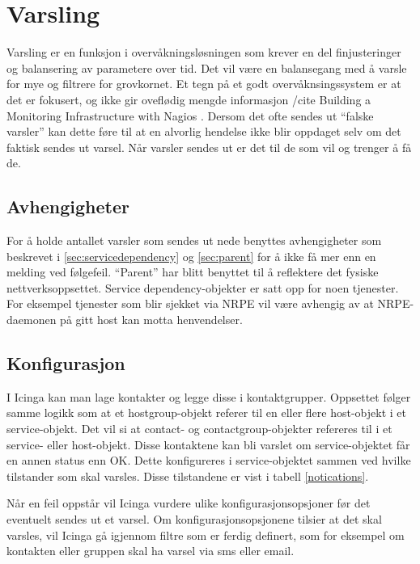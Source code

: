 \section{Varsling}
Varsling er en funksjon i overvåkningsløsningen som krever en del finjusteringer og balansering av parametere over tid. Det vil være en balansegang med å varsle for mye og filtrere for grovkornet. Et tegn på et godt overvåknsingssystem er at det er fokusert, og ikke gir oveflødig mengde informasjon /cite  Building a Monitoring Infrastructure with Nagios . Dersom det ofte sendes ut “falske varsler” kan dette føre til at en alvorlig hendelse ikke blir oppdaget selv om det faktisk sendes ut varsel. Når varsler sendes ut er det til de som vil og trenger å få de.

\subsection{Avhengigheter}
For å holde antallet varsler som sendes ut nede benyttes avhengigheter som beskrevet i \ref{sec:servicedependency}  og \ref{sec:parent} for å ikke få mer enn en melding ved følgefeil. “Parent” har blitt benyttet til å reflektere det fysiske nettverksoppsettet. Service dependency-objekter er satt opp for noen tjenester. For eksempel tjenester som blir sjekket via NRPE vil være avhengig av at NRPE-daemonen på gitt host kan motta henvendelser.

\subsection{Konfigurasjon}
I Icinga kan man lage kontakter og legge disse i kontaktgrupper. Oppsettet følger samme logikk som at et hostgroup-objekt referer til en eller flere host-objekt i et service-objekt.
Det vil si at contact- og contactgroup-objekter refereres til i et service- eller host-objekt. Disse kontaktene kan bli varslet om service-objektet får en annen status enn OK. Dette konfigureres i service-objektet sammen ved hvilke tilstander som skal varsles. Disse tilstandene er vist i tabell \ref{notications}.

Når en feil oppstår vil Icinga vurdere ulike konfigurasjonsopsjoner før det eventuelt sendes ut et varsel. Om konfigurasjonsopsjonene tilsier at det skal varsles, vil Icinga gå igjennom filtre som er ferdig definert, som for eksempel om kontakten eller gruppen skal ha varsel via sms eller email. 

